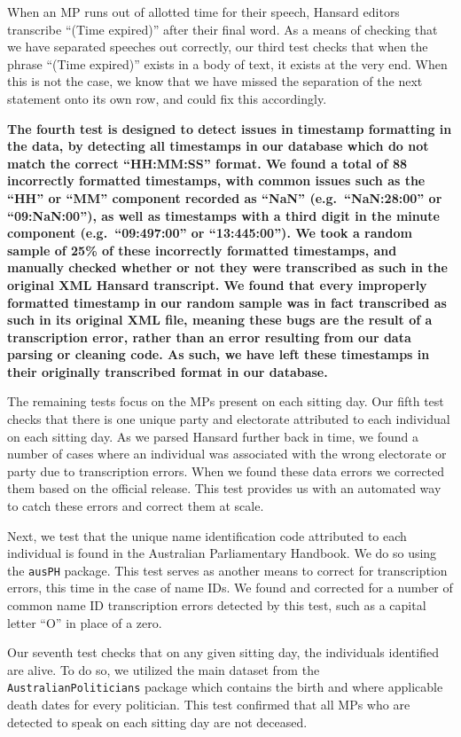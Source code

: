 \documentclass[
  letterpaper,
  DIV=11,
  numbers=noendperiod]{scrartcl}
\begin{document}
When an MP runs out of allotted time for their speech, Hansard editors
transcribe ``(Time expired)'' after their final word. As a means of
checking that we have separated speeches out correctly, our third test
checks that when the phrase ``(Time expired)'' exists in a body of text,
it exists at the very end. When this is not the case, we know that we
have missed the separation of the next statement onto its own row, and
could fix this accordingly.

\textbf{The fourth test is designed to detect issues in timestamp
formatting in the data, by detecting all timestamps in our database
which do not match the correct ``HH:MM:SS'' format. We found a total of
88 incorrectly formatted timestamps, with common issues such as the
``HH'' or ``MM'' component recorded as ``NaN'' (e.g.~``NaN:28:00'' or
``09:NaN:00''), as well as timestamps with a third digit in the minute
component (e.g.~``09:497:00'' or ``13:445:00''). We took a random sample
of 25\% of these incorrectly formatted timestamps, and manually checked
whether or not they were transcribed as such in the original XML Hansard
transcript. We found that every improperly formatted timestamp in our
random sample was in fact transcribed as such in its original XML file,
meaning these bugs are the result of a transcription error, rather than
an error resulting from our data parsing or cleaning code. As such, we
have left these timestamps in their originally transcribed format in our
database.}

The remaining tests focus on the MPs present on each sitting day. Our
fifth test checks that there is one unique party and electorate
attributed to each individual on each sitting day. As we parsed Hansard
further back in time, we found a number of cases where an individual was
associated with the wrong electorate or party due to transcription
errors. When we found these data errors we corrected them based on the
official release. This test provides us with an automated way to catch
these errors and correct them at scale.

Next, we test that the unique name identification code attributed to
each individual is found in the Australian Parliamentary Handbook. We do
so using the \texttt{ausPH} package. This test serves as another means
to correct for transcription errors, this time in the case of name IDs.
We found and corrected for a number of common name ID transcription
errors detected by this test, such as a capital letter ``O'' in place of
a zero.

Our seventh test checks that on any given sitting day, the individuals
identified are alive. To do so, we utilized the main dataset from the
\texttt{AustralianPoliticians} package which contains the birth and
where applicable death dates for every politician. This test confirmed
that all MPs who are detected to speak on each sitting day are not
deceased.
\end{document}
